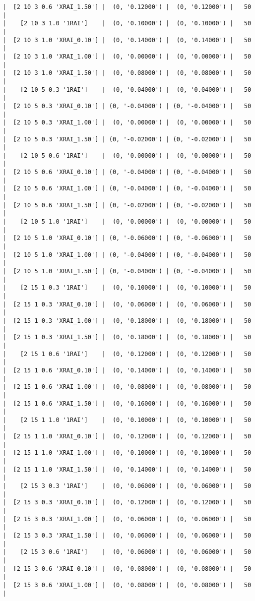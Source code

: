 \documentclass{article}
\begin{document}
\begin{verbatim}
|  [2 10 3 0.6 'XRAI_1.50'] |  (0, '0.12000') |  (0, '0.12000') |   50  |
|    [2 10 3 1.0 '1RAI']    |  (0, '0.10000') |  (0, '0.10000') |   50  |
|  [2 10 3 1.0 'XRAI_0.10'] |  (0, '0.14000') |  (0, '0.14000') |   50  |
|  [2 10 3 1.0 'XRAI_1.00'] |  (0, '0.00000') |  (0, '0.00000') |   50  |
|  [2 10 3 1.0 'XRAI_1.50'] |  (0, '0.08000') |  (0, '0.08000') |   50  |
|    [2 10 5 0.3 '1RAI']    |  (0, '0.04000') |  (0, '0.04000') |   50  |
|  [2 10 5 0.3 'XRAI_0.10'] | (0, '-0.04000') | (0, '-0.04000') |   50  |
|  [2 10 5 0.3 'XRAI_1.00'] |  (0, '0.00000') |  (0, '0.00000') |   50  |
|  [2 10 5 0.3 'XRAI_1.50'] | (0, '-0.02000') | (0, '-0.02000') |   50  |
|    [2 10 5 0.6 '1RAI']    |  (0, '0.00000') |  (0, '0.00000') |   50  |
|  [2 10 5 0.6 'XRAI_0.10'] | (0, '-0.04000') | (0, '-0.04000') |   50  |
|  [2 10 5 0.6 'XRAI_1.00'] | (0, '-0.04000') | (0, '-0.04000') |   50  |
|  [2 10 5 0.6 'XRAI_1.50'] | (0, '-0.02000') | (0, '-0.02000') |   50  |
|    [2 10 5 1.0 '1RAI']    |  (0, '0.00000') |  (0, '0.00000') |   50  |
|  [2 10 5 1.0 'XRAI_0.10'] | (0, '-0.06000') | (0, '-0.06000') |   50  |
|  [2 10 5 1.0 'XRAI_1.00'] | (0, '-0.04000') | (0, '-0.04000') |   50  |
|  [2 10 5 1.0 'XRAI_1.50'] | (0, '-0.04000') | (0, '-0.04000') |   50  |
|    [2 15 1 0.3 '1RAI']    |  (0, '0.10000') |  (0, '0.10000') |   50  |
|  [2 15 1 0.3 'XRAI_0.10'] |  (0, '0.06000') |  (0, '0.06000') |   50  |
|  [2 15 1 0.3 'XRAI_1.00'] |  (0, '0.18000') |  (0, '0.18000') |   50  |
|  [2 15 1 0.3 'XRAI_1.50'] |  (0, '0.18000') |  (0, '0.18000') |   50  |
|    [2 15 1 0.6 '1RAI']    |  (0, '0.12000') |  (0, '0.12000') |   50  |
|  [2 15 1 0.6 'XRAI_0.10'] |  (0, '0.14000') |  (0, '0.14000') |   50  |
|  [2 15 1 0.6 'XRAI_1.00'] |  (0, '0.08000') |  (0, '0.08000') |   50  |
|  [2 15 1 0.6 'XRAI_1.50'] |  (0, '0.16000') |  (0, '0.16000') |   50  |
|    [2 15 1 1.0 '1RAI']    |  (0, '0.10000') |  (0, '0.10000') |   50  |
|  [2 15 1 1.0 'XRAI_0.10'] |  (0, '0.12000') |  (0, '0.12000') |   50  |
|  [2 15 1 1.0 'XRAI_1.00'] |  (0, '0.10000') |  (0, '0.10000') |   50  |
|  [2 15 1 1.0 'XRAI_1.50'] |  (0, '0.14000') |  (0, '0.14000') |   50  |
|    [2 15 3 0.3 '1RAI']    |  (0, '0.06000') |  (0, '0.06000') |   50  |
|  [2 15 3 0.3 'XRAI_0.10'] |  (0, '0.12000') |  (0, '0.12000') |   50  |
|  [2 15 3 0.3 'XRAI_1.00'] |  (0, '0.06000') |  (0, '0.06000') |   50  |
|  [2 15 3 0.3 'XRAI_1.50'] |  (0, '0.06000') |  (0, '0.06000') |   50  |
|    [2 15 3 0.6 '1RAI']    |  (0, '0.06000') |  (0, '0.06000') |   50  |
|  [2 15 3 0.6 'XRAI_0.10'] |  (0, '0.08000') |  (0, '0.08000') |   50  |
|  [2 15 3 0.6 'XRAI_1.00'] |  (0, '0.08000') |  (0, '0.08000') |   50  |

\end{verbatim}
\end{document}
